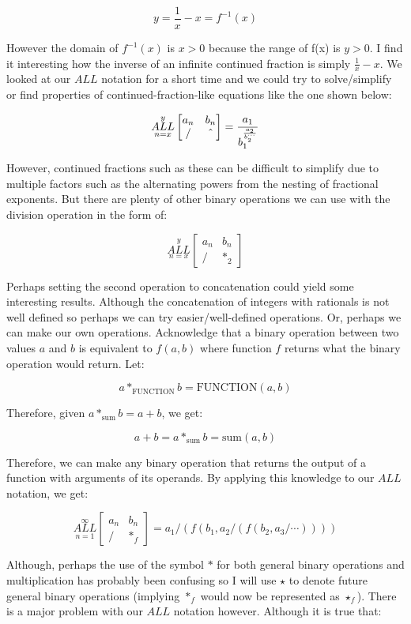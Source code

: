 \documentclass{article}
\begin{document}
$$y=\frac{1}{x}-x=f^{-1}(x)$$

However the domain of $f^{-1}(x)$ is $x>0$ because the range of f(x) is $y>0$. I find it interesting how the inverse of an infinite continued fraction is simply $\frac{1}{x}-x$. We looked at our $ALL$ notation for a short time and we could try to solve/simplify or find properties of continued-fraction-like equations like the one shown below:

$$\underset{n=x}{\overset{y}{ALL}} \begin{bmatrix}
a_n & b_n \\
/ & \string^
\end{bmatrix} = \frac{a_1}{b_1^{\frac{a_2}{b_2^{\cdots}}}}$$

However, continued fractions such as these can be difficult to simplify due to multiple factors such as the alternating powers from the nesting of fractional exponents. But there are plenty of other binary operations we can use with the division operation in the form of:

$$\underset{n=x}{\overset{y}{ALL}} \begin{bmatrix}
a_n & b_n \\
/ & *_2
\end{bmatrix}$$

Perhaps setting the second operation to concatenation could yield some interesting results. Although the concatenation of integers with rationals is not well defined so perhaps we can try easier/well-defined operations. Or, perhaps we can make our own operations. Acknowledge that a binary operation between two values $a$ and $b$ is equivalent to $f(a,b)$ where function $f$ returns what the binary operation would return. Let:

$$a*_{\text{FUNCTION}}b=\text{FUNCTION}(a,b)$$

Therefore, given $a*_{\text{sum}}b=a+b$, we get:

$$a+b=a*_{\text{sum}}b=\text{sum}(a,b)$$

Therefore, we can make any binary operation that returns the output of a function with arguments of its operands. By applying this knowledge to our $ALL$ notation, we get:

$$\underset{n=1}{\overset{\infty}{ALL}} \begin{bmatrix}
a_n & b_n \\
/ & *_f
\end{bmatrix} = a_1 / (f(b_1, a_2 / (f(b_2,a_3 / \cdots))))$$

Although, perhaps the use of the symbol $*$ for both general binary operations and multiplication has probably been confusing so I will use $\star$ to denote future general binary operations (implying $*_f$ would now be represented as $\star_f$). There is a major problem with our $ALL$ notation however. Although it is true that:
\end{document}
